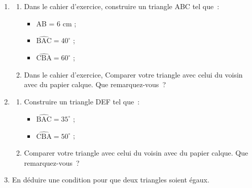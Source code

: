 \documentclass[activite]{thedocument}
\begin{document}
\begin{enumerate}
    \item \begin{enumerate}\item Dans le cahier d'exercice, construire un triangle
    ABC tel que~:
    \begin{itemize}
        \item AB = 6 cm ;
        \item $\widehat{\text{BAC}}=40^\circ$ ;
        \item $\widehat{\text{CBA}}=60^\circ$ ; 
    \end{itemize}
    \item Dans le cahier d'exercice, Comparer votre triangle avec celui du voisin
    avec du papier calque. Que remarquez-vous~?
    \answerspace{5em}
    \end{enumerate}
    \item \begin{enumerate}\item Construire un triangle DEF tel que~:
        \begin{itemize}
            \item $\widehat{\text{BAC}}=35^\circ$ ;
            \item $\widehat{\text{CBA}}=50^\circ$ ;
        \end{itemize}
        \item Comparer votre triangle avec celui du voisin avec du papier calque.
        Que remarquez-vous~?
        \answerspace{5em}
    \end{enumerate}
    \item En déduire une condition pour que deux triangles soient égaux.
    \answerspace{10em}
\end{enumerate}
\end{document}
